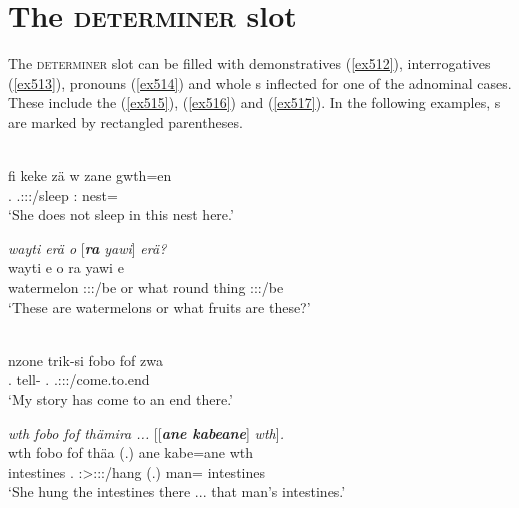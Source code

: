\section{The \textsc{determiner} slot}\label{npsyntaxdeterminer}

The \textsc{determiner} slot can be filled with demonstratives (\ref{ex512}), interrogatives (\ref{ex513}),  pronouns (\ref{ex514}) and whole s inflected for one of the adnominal cases. These include the  (\ref{ex515}),   (\ref{ex516}) and   (\ref{ex517}). In the following examples, s are marked by rectangled parentheses.

\begin{exe}
 	\\
 	\gll fi keke zä w zane gwth=en\\
 	\Third.\Abs{} \Neg{} \Prox{} \Tsg.\F:\Sbj:\Nonpast:\Ipfv/sleep \Dem:\Prox{} nest=\Loc{}\\
 	\trans `She does not sleep in this nest here.'
 	\label{ex512}
\end{exe}
\begin{exe}
 	\ex \emph{wayti erä o} [\emph{\textbf{ra} yawi}] \emph{erä?}\\
 	\gll wayti e o ra yawi e\\
 	watermelon \Stpl:\Sbj:\Nonpast:\Ipfv/be or what {round thing} \Stpl:\Sbj:\Nonpast:\Ipfv/be\\
 	\trans `These are watermelons or what fruits are these?'
 	\label{ex513}
\end{exe}
\begin{exe}
 	\\
 	\gll nzone trik-si fobo fof zwa\\
 	\Fsg.\Poss{} tell-\Nmlz{} \Dist.\All{} \Emph{} \Tsg.\F:\Sbj:\Rpst:\Ipfv/come.to.end\\
 	\trans `My story has come to an end there.'
 	\label{ex514}
\end{exe}
\begin{exe}
 	\ex \emph{wth fobo fof thämira ...} [[\emph{\textbf{ane kabeane}}] \emph{wth}]\emph{.}\\
 	\gll wth fobo fof thäa (.) ane kabe=ane wth\\
 	intestines \Dist.\All{} \Emph{} \Stsg:\Sbj>\Stpl:\Obj:\Pst:\Pfv/hang (.) \Dem{} man=\Poss{} intestines\\
 	\trans `She hung the intestines there ... that man's intestines.'\\
 	\label{ex515}
\end{exe}
